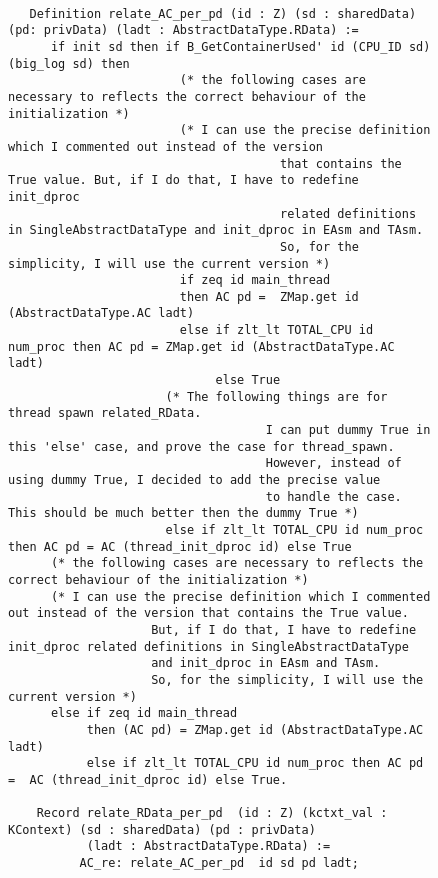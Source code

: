 \begin{figure}
\begin{lstlisting}

   Definition relate_AC_per_pd (id : Z) (sd : sharedData) (pd: privData) (ladt : AbstractDataType.RData) :=
      if init sd then if B_GetContainerUsed' id (CPU_ID sd) (big_log sd) then 
                        (* the following cases are necessary to reflects the correct behaviour of the initialization *)
                        (* I can use the precise definition which I commented out instead of the version 
                                      that contains the True value. But, if I do that, I have to redefine init_dproc
                                      related definitions in SingleAbstractDataType and init_dproc in EAsm and TAsm.
                                      So, for the simplicity, I will use the current version *)
                        if zeq id main_thread 
                        then AC pd =  ZMap.get id (AbstractDataType.AC ladt)
                        else if zlt_lt TOTAL_CPU id num_proc then AC pd = ZMap.get id (AbstractDataType.AC ladt) 
                             else True
                      (* The following things are for thread spawn related_RData.
                                    I can put dummy True in this 'else' case, and prove the case for thread_spawn. 
                                    However, instead of using dummy True, I decided to add the precise value 
                                    to handle the case. This should be much better then the dummy True *)
                      else if zlt_lt TOTAL_CPU id num_proc then AC pd = AC (thread_init_dproc id) else True
      (* the following cases are necessary to reflects the correct behaviour of the initialization *)
      (* I can use the precise definition which I commented out instead of the version that contains the True value.
                    But, if I do that, I have to redefine init_dproc related definitions in SingleAbstractDataType 
                    and init_dproc in EAsm and TAsm.
                    So, for the simplicity, I will use the current version *)
      else if zeq id main_thread 
           then (AC pd) = ZMap.get id (AbstractDataType.AC ladt) 
           else if zlt_lt TOTAL_CPU id num_proc then AC pd =  AC (thread_init_dproc id) else True.
           
    Record relate_RData_per_pd  (id : Z) (kctxt_val : KContext) (sd : sharedData) (pd : privData)
           (ladt : AbstractDataType.RData) :=
          AC_re: relate_AC_per_pd  id sd pd ladt;
          

\end{lstlisting}
\end{figure}
